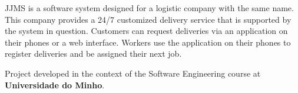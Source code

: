 J\+J\+MS is a software system designed for a logistic company with the same name. This company provides a 24/7 customized delivery service that is supported by the system in question. Customers can request deliveries via an application on their phones or a web interface. Workers use the application on their phones to register deliveries and be assigned their next job.

Project developed in the context of the Software Engineering course at {\bfseries Universidade do Minho}. 